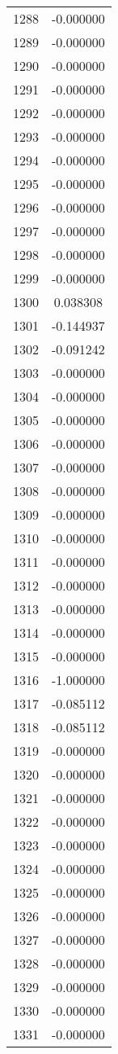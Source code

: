 \documentclass[12pt]{article}
\begin{document}
\begin{longtable}{@{}cc@{}}
1288 & -0.000000 \\
1289 & -0.000000 \\
1290 & -0.000000 \\
1291 & -0.000000 \\
1292 & -0.000000 \\
1293 & -0.000000 \\
1294 & -0.000000 \\
1295 & -0.000000 \\
1296 & -0.000000 \\
1297 & -0.000000 \\
1298 & -0.000000 \\
1299 & -0.000000 \\
1300 & 0.038308 \\
1301 & -0.144937 \\
1302 & -0.091242 \\
1303 & -0.000000 \\
1304 & -0.000000 \\
1305 & -0.000000 \\
1306 & -0.000000 \\
1307 & -0.000000 \\
1308 & -0.000000 \\
1309 & -0.000000 \\
1310 & -0.000000 \\
1311 & -0.000000 \\
1312 & -0.000000 \\
1313 & -0.000000 \\
1314 & -0.000000 \\
1315 & -0.000000 \\
1316 & -1.000000 \\
1317 & -0.085112 \\
1318 & -0.085112 \\
1319 & -0.000000 \\
1320 & -0.000000 \\
1321 & -0.000000 \\
1322 & -0.000000 \\
1323 & -0.000000 \\
1324 & -0.000000 \\
1325 & -0.000000 \\
1326 & -0.000000 \\
1327 & -0.000000 \\
1328 & -0.000000 \\
1329 & -0.000000 \\
1330 & -0.000000 \\
1331 & -0.000000 \\

\end{longtable}
\end{document}
